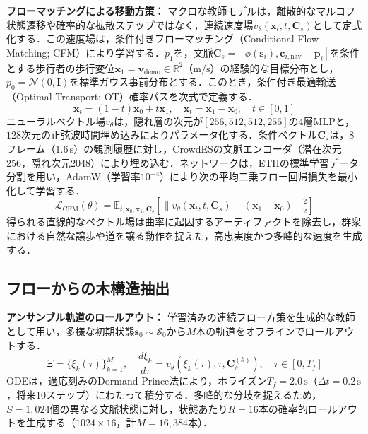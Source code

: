 \documentclass{sice-si}
\begin{document}
\textbf{フローマッチングによる移動方策：}
マクロな教師モデルは，離散的なマルコフ状態遷移や確率的な拡散ステップではなく，連続速度場$v_\theta(\mathbf{x}_t, t, \mathbf{C}_s)$として定式化する．この速度場は，条件付きフローマッチング（Conditional Flow Matching; CFM）\cite{lipman2023flow}により学習する．$p_1$を，文脈$\mathbf{C}_s = [\phi(\mathbf{s}_i), \mathbf{c}_{i, \text{nav}} - \mathbf{p}_i]$を条件とする歩行者の歩行変位$\mathbf{x}_1 = \mathbf{v}_{\text{demo}} \in \mathbb{R}^2$（$\text{m/s}$）の経験的な目標分布とし，$p_0 = \mathcal{N}(0, \mathbf{I})$を標準ガウス事前分布とする．このとき，条件付き最適輸送（Optimal Transport; OT）確率パスを次式で定義する．
\begin{equation}
    \mathbf{x}_t = (1 - t)\mathbf{x}_0 + t \mathbf{x}_1, \quad \dot{\mathbf{x}}_t = \mathbf{x}_1 - \mathbf{x}_0, \quad t \in [0, 1]
\end{equation}
ニューラルベクトル場$v_\theta$は，隠れ層の次元が$[256, 512, 512, 256]$の4層MLPと，$128$次元の正弦波時間埋め込みによりパラメータ化する．条件ベクトル$\mathbf{C}_s$は，8フレーム（$1.6\,\text{s}$）の観測履歴に対し，CrowdESの文脈エンコーダ（潜在次元256，隠れ次元2048）により埋め込む．ネットワークは，ETHの標準学習データ分割を用い，AdamW（学習率$10^{-4}$）により次の平均二乗フロー回帰損失を最小化して学習する．
\begin{equation}
    \mathcal{L}_{\text{CFM}}(\theta) = \mathbb{E}_{t, \mathbf{x}_0, \mathbf{x}_1, \mathbf{C}_s} \left[ \left\| v_\theta(\mathbf{x}_t, t, \mathbf{C}_s) - (\mathbf{x}_1 - \mathbf{x}_0) \right\|_2^2 \right]
\end{equation}
得られる直線的なベクトル場は曲率に起因するアーティファクトを除去し，群衆における自然な譲歩や道を譲る動作を捉えた，高忠実度かつ多峰的な速度を生成する．

\subsection{フローからの木構造抽出}
\textbf{アンサンブル軌道のロールアウト：}
学習済みの連続フロー方策を生成的な教師として用い，多様な初期状態$\mathbf{s}_0 \sim \mathcal{S}_0$から$M$本の軌道をオフラインでロールアウトする．
\begin{equation}
    \Xi = \{\xi_k(\tau)\}_{k=1}^M, \quad \frac{d\xi_k}{d\tau} = v_\theta(\xi_k(\tau), \tau, \mathbf{C}_s^{(k)}), \quad \tau \in [0, T_f]
\end{equation}
ODEは，適応刻みのDormand-Prince法により，ホライズン$T_f = 2.0\,\text{s}$（$\Delta t = 0.2\,\text{s}$，将来10ステップ）にわたって積分する．多峰的な分岐を捉えるため，$S = 1,024$個の異なる文脈状態に対し，状態あたり$R = 16$本の確率的ロールアウトを生成する（$1024 \times 16$，計$M = 16,384$本）．
\end{document}
